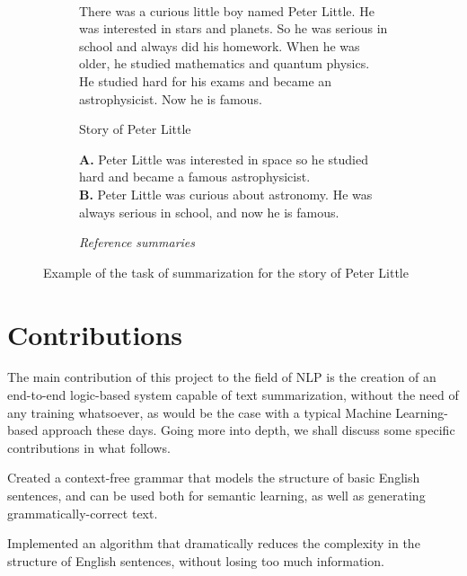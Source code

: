 \begin{figure}[H]\
\begin{subfigure}{\textwidth}
\begin{displayquote}
There was a curious little boy named Peter Little. He was interested in stars and planets. So he was serious in school and always did his homework. When he was older, he studied mathematics and quantum physics. He studied hard for his exams and became an astrophysicist. Now he is famous.
\end{displayquote}
\caption{Story of Peter Little}
\vspace{\baselineskip}
\end{subfigure}
\begin{subfigure}{\textwidth}
\begin{displayquote}
\textbf{A.} Peter Little was interested in space so he studied hard and became a famous astrophysicist.\\
\textbf{B.} Peter Little was curious about astronomy. He was always serious in school, and now he is famous.
\caption{\textit{Reference summaries}}
\end{displayquote}
\end{subfigure}
\caption{Example of the task of summarization for the story of Peter Little}
\label{fig:peter_little}
\end{figure}

\section{Contributions}

The main contribution of this project to the field of NLP is the creation of an end-to-end logic-based system capable of text summarization, without the need of any training whatsoever, as would be the case with a typical Machine Learning-based approach these days. Going more into depth, we shall discuss some specific contributions in what follows.

\begin{contribution}
Created a context-free grammar that models the structure of basic English sentences, and can be used both for semantic learning, as well as generating grammatically-correct text.
\end{contribution}

\begin{contribution}
Implemented an algorithm that dramatically reduces the complexity in the structure of English sentences, without losing too much information.
\end{contribution}

